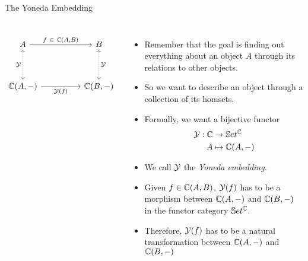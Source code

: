 \begin{frame}[fragile]{The Yoneda Embedding}
	\begin{columns}
		\[\begin{tikzcd}
			A && B \\
			\\
			{\bC(A, -)} && {\bC(B,-)}
			\arrow["{f\ \in\ \mathbb{C}(A,B)}", from=1-1, to=1-3]
			\arrow["{\mathcal{Y}}"', dotted, leftrightarrow, from=1-1, to=3-1]
			\arrow["{\mathcal{Y}}", dotted, leftrightarrow, from=1-3, to=3-3]
			\arrow["{\mathcal{Y}(f)}"', from=3-1, to=3-3]
		\end{tikzcd}\]
		\begin{itemize}
			\item Remember that the goal is finding out everything about an object $A$ through its relations to other objects.
			\pause\item So we want to describe an object through a collection of its homsets.
			\pause\item Formally, we want a bijective functor
			\begin{align*}
				\mathcal{Y} : \mathbb{C} &\to \mathbb{S} et^{\mathbb{C}}\\
				A &\mapsto \mathbb{C}(A,-)
			\end{align*}
			\vspace{-16pt}\pause\item We call $\mathcal{Y}$ the \textit{Yoneda embedding}.
			\pause\item Given $f \in \mathbb{C}(A,B)$, $\mathcal{Y}(f)$ has to be a morphism between $\mathbb{C}(A, -)$ and $\mathbb{C}(B, -)$ in the functor category $\mathbb{S} et^{\mathbb{C}}$.
			\pause\item Therefore, $\mathcal{Y}(f)$ has to be a natural transformation between $\mathbb{C}(A, -)$ and $\mathbb{C}(B, -)$
		\end{itemize}
	\end{columns}
\end{frame}

